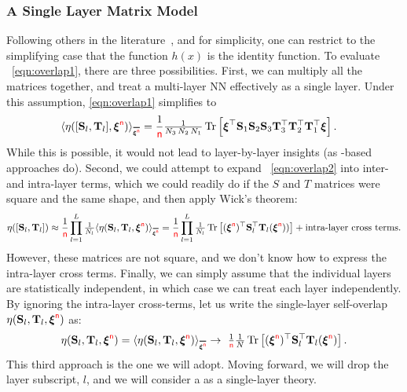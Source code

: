 \subsubsection{A Single Layer Matrix Model}
Following others in the literature~\cite{SMG2013_TR}, and for simplicity, one can restrict to the simplifying case that the function $h(x)$ is the identity function.
To evaluate \EQN~\ref{eqn:overlap1}, there are three possibilities.
First, we can multiply all the matrices together, and treat a multi-layer NN effectively as a single layer.
Under this assumption, \EQN \ref{eqn:overlap1} simplifies to
%
\begin{align}
\label{eqn:overlap2}
  \ETAMLPAVG &= \frac{1}{\ND}\tfrac{1}{N_3 \, N_2 \, N_1} 
  \Trace{ \boldsymbol{\xi}^\top 
    \SMAT_1 \SMAT_2 \SMAT_3 
    \TMAT_3^{\top} \TMAT_2^{\top} \TMAT_1^{\top} 
    \boldsymbol{\xi} }.
\end{align}
While this is possible, it would not lead to layer-by-layer insights (as \HTSR-based approaches do).
%
Second, we could attempt to expand \EQN~\ref{eqn:overlap2} into inter- and intra-layer terms, 
which we could readily do if the $S$ and $T$ matrices were square and the same shape, and then apply Wick's theorem:
\begin{align}
\ETAMLP\approx\frac{1}{\ND}\prod_{l=1}^{L}\tfrac{1}{N_l}\ETAMATAVG=
\frac{1}{\ND}\prod_{l=1}^{L}\tfrac{1}{N_l}\Trace{ (\NDXI)^{\top} \SMAT^{\top}_{l} \TMAT_{l} (\NDXI)) } +\text{intra-layer cross terms}.
\end{align}
However, these matrices are not square, and we don't know how to express the intra-layer cross terms.
%
Finally, we can simply assume that the individual layers are statistically independent, in which case we can treat each layer independently.
By ignoring the intra-layer cross-terms, let us write the single-layer self-overlap $\eta({\mathbf{S}}_l,{\mathbf{T}}_l,\boldsymbol{\xi}^{{\color{red}\sf{n}}})$ as:
\begin{align}
  \label{eqn:eta}
  \ETAMAT =
        \ETAMATAVG\rightarrow \
        \tfrac{1}{\ND}\tfrac{1}{N} \Trace{ (\NDXI)^{\top} \SMAT^{\top}_{l} \TMAT_{l} (\NDXI) }  .
\end{align}
This third approach is the one we will adopt.
Moving forward, we will drop the layer subscript, $l$, and we will consider a \SETOL as a single-layer theory.


